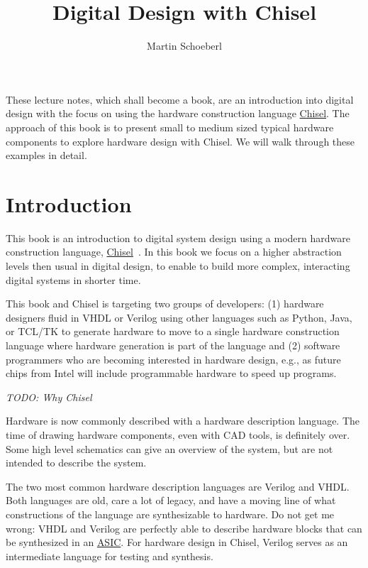 \documentclass[%
    10pt, %
    headinclude, footexclude,
    openright, %
    notitlepage,
    cleardoubleempty,
    headsepline,
    pointlessnumbers,
    bibtotoc, idxtotoc,
    ]{scrbook}
\newcommand{\todo}[1]{{\emph{TODO: #1}}}
\newcommand{\myref}[2]{\href{#1}{#2}}
\begin{document}
\title{Digital Design with Chisel}

\author{Martin Schoeberl}

\maketitle \thispagestyle{empty}

These lecture notes, which shall become a book, are an introduction into digital design with the focus
on using the hardware construction language
\myref{https://chisel.eecs.berkeley.edu/}{Chisel}. The approach of this book
is to present small to medium sized typical hardware components to explore
hardware design with Chisel.
We will walk through these examples in detail.

\tableofcontents

\chapter{Introduction}
\label{sec:intro}

This book is an introduction to digital system design using a modern hardware
construction language, \myref{https://chisel.eecs.berkeley.edu/}{Chisel}~\cite{chisel:dac2012}.
In this book we focus on a higher abstraction levels then usual in digital design,
to enable to build more complex, interacting digital systems in shorter time.

This book and Chisel is targeting two groups of developers:
(1) hardware designers fluid in VHDL or Verilog using other languages such as Python,
Java, or TCL/TK to generate hardware to move to a single hardware construction language
where hardware generation is part of the language and
(2) software programmers who are becoming interested in hardware design,
e.g., as future chips from Intel will include programmable hardware to speed up programs.

\todo{Why Chisel}

Hardware is now commonly described with a hardware description language.
The time of drawing hardware components, even with CAD tools, is definitely
over. Some high level schematics can give an overview of the system, but are
not intended to describe the system.

The two most common hardware description languages are Verilog and VHDL.
Both languages are old, care a lot of legacy, and have a moving line of what
constructions of the language are synthesizable to hardware.
Do not get me wrong: VHDL and Verilog are perfectly able to describe hardware
blocks that can be synthesized in an
\myref{https://en.wikipedia.org/wiki/Application-specific_integrated_circuit}{ASIC}.
For hardware design in Chisel, Verilog serves as an intermediate language
for testing and synthesis.
\end{document}
